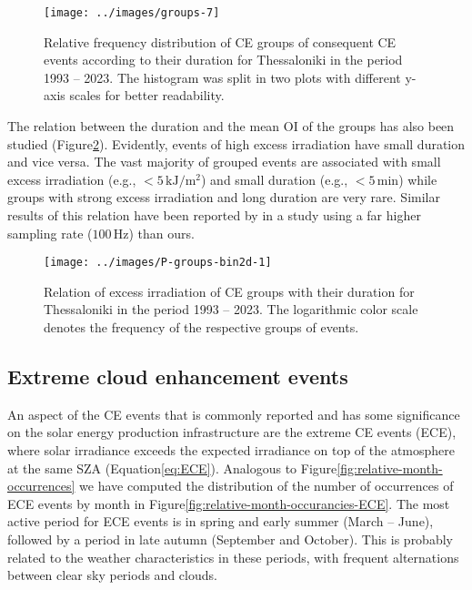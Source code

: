 \documentclass[preprint, 5p,
authoryear]{elsarticle} %
\begin{document}
\begin{figure}

{\centering \texttt{[image: ../images/groups-7]} 

}

\caption{Relative frequency distribution of CE groups of consequent CE events according to their duration for Thessaloniki in the period 1993 -- 2023. The histogram was split in two plots with different y-axis scales for better readability.}\label{fig:ceg-duration-distribution}
\end{figure}

The relation between the duration and the mean OI of the groups has also
been studied (Figure\nobreakspace{}\ref{fig:group-2d}). Evidently,
events of high excess irradiation have small duration and vice versa.
The vast majority of grouped events are associated with small excess
irradiation (e.g., \(<5\,\text{kJ}/\text{m}^2\)) and small duration
(e.g., \(<5\,\text{min}\)) while groups with strong excess irradiation
and long duration are very rare. Similar results of this relation have
been reported by \citet{Zhang2018} in a study using a far higher
sampling rate (\(100\,\text{Hz}\)) than ours.

\begin{figure}

{\centering \texttt{[image: ../images/P-groups-bin2d-1]} 

}

\caption{Relation of excess irradiation of CE groups with their duration for Thessaloniki in the period 1993 -- 2023. The logarithmic color scale denotes the frequency of the respective groups of events.}\label{fig:group-2d}
\end{figure}

\hypertarget{extreme-cloud-enhancement-events}{%
\subsection{Extreme cloud enhancement
events}\label{extreme-cloud-enhancement-events}}

An aspect of the CE events that is commonly reported and has some
significance on the solar energy production infrastructure are the
extreme CE events (ECE), where solar irradiance exceeds the expected
irradiance on top of the atmosphere at the same SZA
(Equation\nobreakspace{}\ref{eq:ECE}). Analogous to
Figure\nobreakspace{}\ref{fig:relative-month-occurrences} we have
computed the distribution of the number of occurrences of ECE events by
month in Figure\nobreakspace{}\ref{fig:relative-month-occurancies-ECE}.
The most active period for ECE events is in spring and early summer
(March -- June), followed by a period in late autumn (September and
October). This is probably related to the weather characteristics in
these periods, with frequent alternations between clear sky periods and
clouds.
\end{document}
